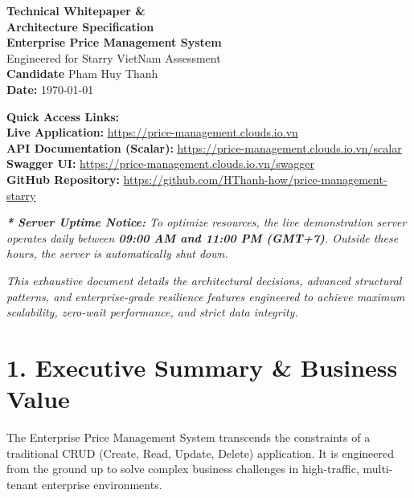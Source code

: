 \documentclass[12pt,a4paper]{article}
\begin{document}
\begin{titlepage}
    \centering
    \vspace*{2cm}
    
    {\Huge \bfseries Technical Whitepaper \&\\[0.3cm] Architecture Specification}\\[1.5cm]
    
    {\LARGE \textbf{Enterprise Price Management System}}\\[0.5cm]
    {\large Engineered for Starry VietNam Assessment}\\[2cm]
    
    \textbf{Candidate } Pham Huy Thanh\\[0.5cm]
    \textbf{Date:} \today\\[3cm]
    
    \begin{flushleft}
        \Large \textbf{Quick Access Links:}\\[0.5cm]
        \normalsize
        \textbf{Live Application:} \url{https://price-management.clouds.io.vn}\\
        \textbf{API Documentation (Scalar):} \url{https://price-management.clouds.io.vn/scalar}\\
        \textbf{Swagger UI:} \url{https://price-management.clouds.io.vn/swagger}\\
        \textbf{GitHub Repository:} \url{https://github.com/HThanh-how/price-management-starry}
    \end{flushleft}
    
    \vspace{0.3cm}
    \textit{\textbf{* Server Uptime Notice:} To optimize resources, the live demonstration server operates daily between \textbf{09:00 AM and 11:00 PM (GMT+7)}. Outside these hours, the server is automatically shut down.}
    
    \vfill
    \textit{This exhaustive document details the architectural decisions, advanced structural patterns, and enterprise-grade resilience features engineered to achieve maximum scalability, zero-wait performance, and strict data integrity.}
\end{titlepage}

\section{1. Executive Summary \& Business Value}
The Enterprise Price Management System transcends the constraints of a traditional CRUD (Create, Read, Update, Delete) application. It is engineered from the ground up to solve complex business challenges in high-traffic, multi-tenant enterprise environments. 
\end{document}
